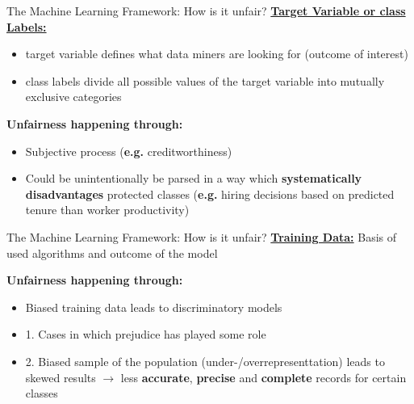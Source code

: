 \begin{frame}{The Machine Learning Framework: How is it unfair? \cite{Barocas.2016, barocas-hardt-narayanan}}
    \underline{\textbf{Target Variable or class Labels:}} \\
    \begin{itemize}
        \item target variable defines what data miners are looking for (outcome of interest)
        \item class labels divide all possible values of the target variable into mutually exclusive categories
    \end{itemize}

    \begin{block}{\textbf{Unfairness happening through:}}
    \begin{itemize}
        \item Subjective process (\textbf{e.g.} creditworthiness)
        \item Could be unintentionally be parsed in a way which \textbf{systematically disadvantages} protected classes (\textbf{e.g.} hiring decisions based on predicted tenure than worker productivity)
    \end{itemize}
        \end{block}
\end{frame}

\begin{frame}{The Machine Learning Framework: How is it unfair? \cite{Barocas.2016, barocas-hardt-narayanan}}
    \underline{\textbf{Training Data:}} Basis of used algorithms and outcome of the model \newline 

    \begin{block}{\textbf{Unfairness happening through:}}
    \begin{itemize}
        \item Biased training data leads to discriminatory models
        \item 1. Cases in which prejudice has played some role
        \item 2. Biased sample of the population (under-/overrepresenttation) leads to skewed results\newline
        $\rightarrow$ less \textbf{accurate}, \textbf{precise} and \textbf{complete} records for certain classes
    \end{itemize}
        \end{block}
\end{frame}

